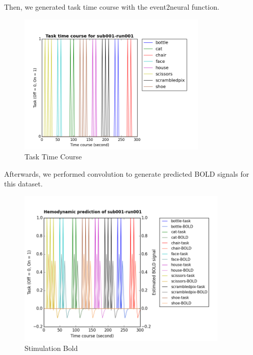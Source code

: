 \documentclass[11pt,twocolumn]{article}
\begin{document}
Then, we generated task time course with the event2neural function.
\begin{figure}[h!]
\centering
\includegraphics[width=90mm]{Task_time_course_sub001_run001.png}
\caption{Task Time Course}
\end{figure}

\pagebreak 

Afterwards, we performed convolution to generate predicted BOLD signals for this 
dataset.
\begin{figure}[h!]
\centering
\includegraphics[width=100mm]{sub001_run001_bold_prediction.png}
\caption{Stimulation Bold}
\end{figure}
\end{document}
